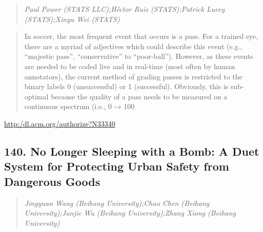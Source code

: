 \documentclass{article}
\begin{document}
\begin{quote}
\footnotesize{\textit{Paul Power (STATS LLC);Héctor Ruiz (STATS);Patrick Lucey (STATS);Xinyu Wei (STATS)}}

\end{quote}

\begin{quote}
In soccer, the most frequent event that occurs is a pass. For a trained eye, there are a myriad of adjectives which could describe this event (e.g., “majestic pass”, “conservative” to “poor-ball”). However, as these events are needed to be coded live and in real-time (most often by human annotators), the current method of grading passes is restricted to the binary labels 0 (unsuccessful) or 1 (successful). Obviously, this is sub-optimal because the quality of a pass needs to be measured on a continuous spectrum (i.e., 0 → 100%
\end{quote}

\href{http:/dl.acm.org/authorize?N33340}{http:/dl.acm.org/authorize?N33340}

\subsection{140. No Longer Sleeping with a Bomb: A Duet System for Protecting Urban Safety from Dangerous Goods}

\begin{quote}
\footnotesize{\textit{Jingyuan Wang (Beihang University);Chao Chen (Beihang University);Junjie Wu (Beihang University);Zhang Xiong (Beihang University)}}

\end{quote}
\end{document}
